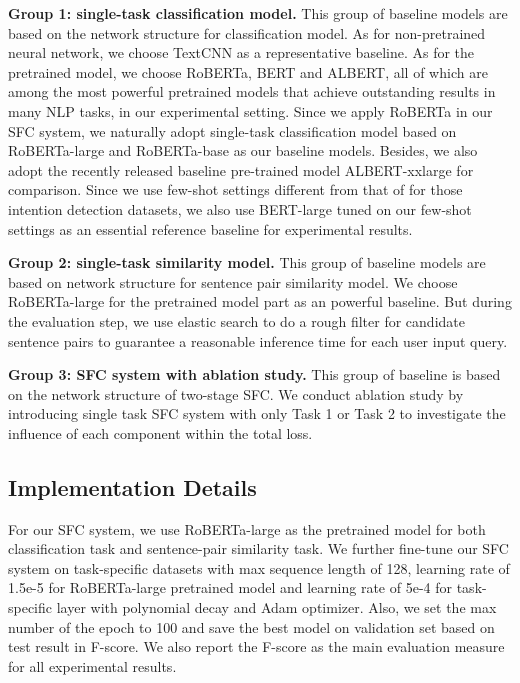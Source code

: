 \documentclass[letterpaper]{article} %
\begin{document}
  \textbf{Group  1:  single-task  classification  model.} This group of baseline
  models  are  based  on the network structure for classification model.   As   for   non-pretrained   neural   network,  we  choose
  TextCNN \cite{kim2014convolutional}  as  a  representative baseline. As for the
  pretrained  model,  we choose RoBERTa, BERT and ALBERT, all of which are among
  the  most  powerful pretrained models that achieve outstanding results in many
  NLP  tasks,  in  our  experimental  setting. Since we apply RoBERTa in our SFC
  system,   we   naturally  adopt  single-task  classification  model  based  on
  RoBERTa-large  and RoBERTa-base as our baseline models. Besides, we also adopt
  the       recently       released       baseline       pre-trained       model
  ALBERT-xxlarge \cite{lan2019albert}  for  comparison.  Since  we  use few-shot   settings   different from    that of \cite{casanueva2020efficient}  for  those
  intention
  detection  datasets,  we also use BERT-large tuned on our few-shot settings as
  an essential reference baseline for experimental results.


  \textbf{Group  2: single-task similarity model.} This group of baseline models
  are   based   on   network   structure   for   sentence pair similarity   model. We choose RoBERTa-large for the pretrained model part as an
  powerful baseline. But during the evaluation step, we use elastic search to do
  a  rough  filter  for  candidate  sentence  pairs  to  guarantee  a reasonable
  inference time for each user input query.

  \textbf{Group  3:  SFC  system with ablation study.} This group of baseline is
  based  on  the network structure of two-stage SFC. We
  conduct  ablation study by introducing single task SFC system with only Task 1
  or  Task  2  to  investigate  the influence of each component within the total
  loss.

  \subsection{Implementation Details}
  For  our  SFC  system,  we  use RoBERTa-large as the pretrained model for both
  classification  task  and  sentence-pair similarity task. We further fine-tune
  our  SFC  system  on  task-specific  datasets with max sequence length of 128,
  learning  rate  of 1.5e-5 for RoBERTa-large pretrained model and learning rate
  of  5e-4  for  task-specific  layer  with polynomial decay and Adam optimizer.
  Also,  we  set  the  max number of the epoch to 100 and save the best model on
  validation  set based on test result in F-score. We also report the F-score as
  the main evaluation measure for all experimental results.
\end{document}
